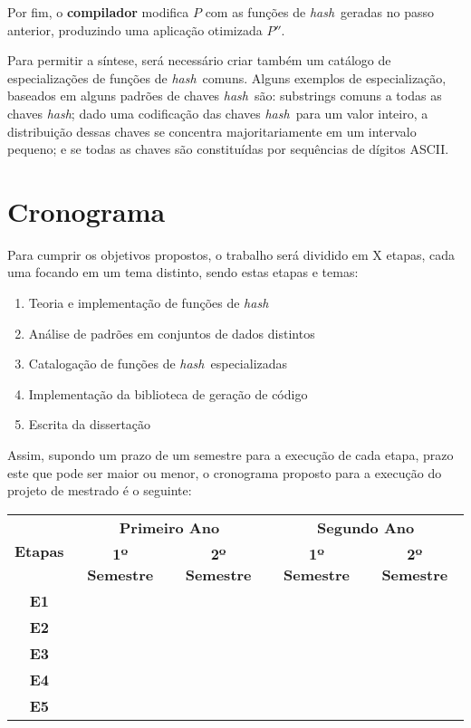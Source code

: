 \documentclass[12pt]{article}
\newcommand{\hash}{\textit{hash}}
\begin{document}
Por fim, o \textbf{compilador} modifica $P$ com as funções de \hash\ geradas no passo anterior, produzindo uma aplicação otimizada $P''$.

Para permitir a síntese, será necessário criar também um catálogo de especializações de funções de \hash\ comuns. Alguns exemplos de especialização, baseados em alguns padrões de chaves \hash\ são: substrings comuns a todas as chaves \hash; dado uma codificação das chaves \hash\ para um valor inteiro, a distribuição dessas chaves se concentra majoritariamente em um intervalo pequeno; e se todas as chaves são constituídas por sequências de dígitos ASCII.

\section{Cronograma}


Para cumprir os objetivos propostos, o trabalho será dividido em X etapas, cada uma focando em um tema distinto, sendo estas etapas e temas:

\begin{enumerate}[label=(E\arabic*)]
    \item Teoria e implementação de funções de \hash
    \item Análise de padrões em conjuntos de dados distintos
    \item Catalogação de funções de \hash\ especializadas
    \item Implementação da biblioteca de geração de código
    \item Escrita da dissertação
\end{enumerate}

Assim, supondo um prazo de um semestre para a execução de cada etapa, prazo este que pode ser maior ou menor, o cronograma proposto para a execução do projeto de mestrado é o seguinte:


\vspace{0.5cm}
{
    \noindent \begin{tabular}{|c|c|c|c|c|}
      \hline
      \multirow{2}{*}{\textbf{\small{Etapas}}} & \multicolumn{2}{|c|}{\textbf{\small{Primeiro Ano}}} &
      \multicolumn{2}{|c|}{\textbf{\small{Segundo Ano}}} \\
      \cline{2-5}
      & \textbf{1º Semestre} & \textbf{2º Semestre} & \textbf{1º Semestre} & \textbf{2º Semestre}  \\
      \hline
      \textbf{\small{E1}}  & \cellcolor{gray} &  &  &   \\
      \hline
      \textbf{\small{E2}}  &   & \cellcolor{gray} & &  \\
      \hline
      \textbf{\small{E3}}  &   &  & \cellcolor{gray} & \cellcolor{gray} \\
      \hline
      \textbf{\small{E4}}  &   &   &  \cellcolor{gray} & \cellcolor{gray} \\
      \hline
      \textbf{\small{E5}}  &  \cellcolor{gray} & \cellcolor{gray}   & \cellcolor{gray} &  \cellcolor{gray}  \\
      \hline
    \end{tabular}
}
\end{document}
